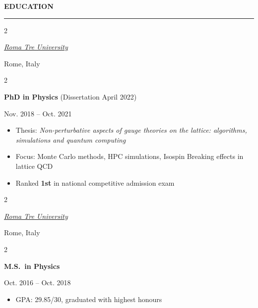 \documentclass[
  18,
]{article}
\begin{document}
\begin{large}{\bf EDUCATION}
  \vspace{9pt}
  \hrule
  \vspace{9pt}

  \begin{multicols}{2}
    \begin{flushleft}{\href{https://www.uniroma3.it/}{\textit{Roma Tre University}}}\end{flushleft}
    \begin{flushright}Rome, Italy\end{flushright}
  \end{multicols}
  \vspace{-0.15cm}
  \begin{multicols}{2}
    \begin{flushleft}
    \textbf{PhD in Physics} (Dissertation April 2022) 
    \end{flushleft}
    \begin{flushright}Nov. 2018 -- Oct. 2021\end{flushright}
  \end{multicols}
  \vspace{-0.2cm}
  \begin{itemize}
    \item Thesis: \textit{Non-perturbative aspects of gauge theories on the lattice: algorithms, simulations and quantum computing}
    \item Focus: Monte Carlo methods, HPC simulations, Isospin Breaking effects in lattice QCD
    \item Ranked \textbf{1st} in national competitive admission exam
  \end{itemize}

  \begin{multicols}{2}
    \begin{flushleft}{\href{https://www.uniroma3.it/}{\textit{Roma Tre University}}}\end{flushleft}
    \begin{flushright}Rome, Italy\end{flushright}
  \end{multicols}
  \vspace{-0.15cm}
  \begin{multicols}{2}
    \begin{flushleft}
    \textbf{M.S.\ in Physics}
    \end{flushleft}
    \begin{flushright}Oct. 2016 -- Oct. 2018\end{flushright}
  \end{multicols}
  \vspace{-0.2cm}
  \begin{itemize}
    \item GPA: 29.85/30, graduated with highest honours
  \end{itemize}


\end{large}
\end{document}
